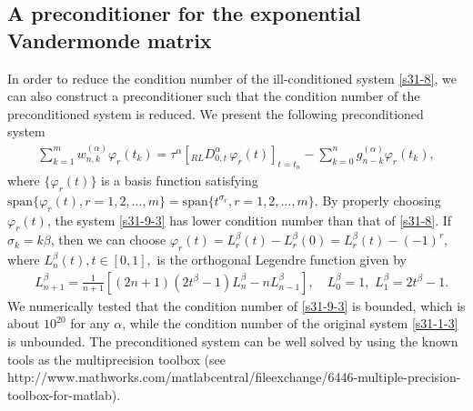 \documentclass[10pt]{siamltex}
\begin{document}
\subsection{A preconditioner for the exponential Vandermonde matrix}
In order to reduce the condition number of the ill-conditioned system \eqref{s31-8},
we can also construct a preconditioner such that the condition number of the preconditioned system is reduced. We present the following preconditioned system
 \begin{equation}\label{s31-9-3}\begin{aligned}
\sum_{k=1}^m w_{n,k}^{(\alpha)}\varphi_{r}(t_k)
=\tau^{\alpha}\left[{}_{RL}D_{0,t}^{\alpha}\,\varphi_{r}(t)\right]_{t=t_n}
-\sum_{k=0}^{n}g^{(\alpha)}_{n-k}\varphi_{r}(t_k),
\end{aligned}\end{equation}
where $\{\varphi_{r}(t)\}$ is a basis function satisfying
$\mathrm{span}\{\varphi_{r}(t),r=1,2,...,m\}=\mathrm{span}\{t^{\sigma_r},r=1,2,...,m\}$.
By properly choosing $\varphi_{r}(t)$, the system \eqref{s31-9-3} has lower condition number than that of \eqref{s31-8}. If $\sigma_k=k\beta$, then we can choose $\varphi_{r}(t)=L_r^{\beta}(t) - L_r^{\beta}(0)=L_r^{\beta}(t) - (-1)^{r}$, where $L_{n}^{\beta}(t),t\in [0,1],$ is the  orthogonal Legendre function given by
\begin{equation}\label{s31-10}\begin{aligned}
&L_{n+1}^{\beta}=\frac{1}{n+1}\left[(2n+1)(2t^{\beta}-1)L_{n}^{\beta}
-nL_{n-1}^{\beta}\right],{\quad}
L_0^{\beta}=1,\,\, L_1^{\beta}=2t^{\beta}-1.
\end{aligned}\end{equation}
We numerically tested that the condition number of \eqref{s31-9-3} is bounded, which is about
$10^{20}$ for any $\alpha$, while the condition number of the original system \eqref{s31-1-3} is unbounded. The preconditioned system can be well solved by using the known tools as  the multiprecision toolbox (see
http://www.mathworks.com/matlabcentral/fileexchange/6446-multiple-precision-toolbox-for-matlab).
\fi
\end{document}
